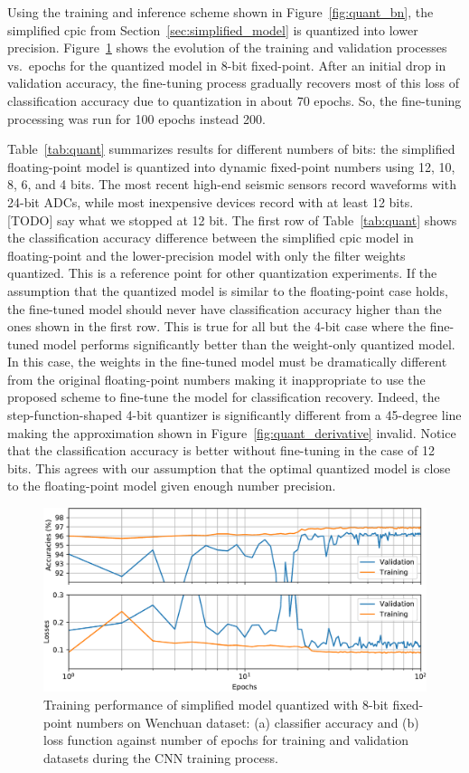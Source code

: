 \documentclass{article}
\begin{document}
Using the training and inference scheme shown in Figure~\ref{fig:quant_bn}, the simplified \gls{cpic} from Section~\ref{sec:simplified_model} is quantized into lower precision.
Figure~\ref{fig:train_cpicv2_8bit} shows the evolution of the training and validation processes vs.\ epochs for the quantized model in 8-bit fixed-point.
After an initial drop in validation accuracy, the fine-tuning process gradually recovers most of this loss of classification accuracy due to quantization in about 70 epochs.
So, the fine-tuning processing was run for 100 epochs instead 200.

Table~\ref{tab:quant} summarizes results for different numbers of bits: the simplified floating-point model is quantized into dynamic fixed-point numbers using 12, 10, 8, 6, and 4 bits.
The most recent high-end seismic sensors record waveforms with 24-bit ADCs, while most inexpensive devices record with at least 12 bits. 
[TODO] say what we stopped at 12 bit.
The first row of Table~\ref{tab:quant} shows the classification accuracy difference between the simplified \gls{cpic} model in floating-point and the lower-precision model with only the filter weights quantized.
This is a reference point for other quantization experiments.
If the assumption that the quantized model is similar to the floating-point case holds, the fine-tuned model should never have classification accuracy higher than the ones shown in the first row.
This is true for all but the 4-bit case where the fine-tuned model performs significantly better than the weight-only quantized model.
In this case, the weights in the fine-tuned model must be dramatically different from the original floating-point numbers making it inappropriate to use the proposed scheme to fine-tune the model for classification recovery.
Indeed, the step-function-shaped 4-bit quantizer is significantly different from a 45-degree line making the approximation shown in Figure~\ref{fig:quant_derivative} invalid.
Notice that the classification accuracy is better without fine-tuning in the case of 12 bits.
This agrees with our assumption that the optimal quantized model is close to the floating-point model given enough number precision.
%
\begin{figure}
    \centering
    \includegraphics[width=\linewidth]{evaluate_train_quant_8bit}
    \caption{Training performance of simplified  model quantized with 8-bit fixed-point numbers on Wenchuan dataset: (a) classifier accuracy and (b) loss function against number of epochs for training and validation datasets during the CNN training process.}
    \label{fig:train_cpicv2_8bit}
\end{figure}
\end{document}

